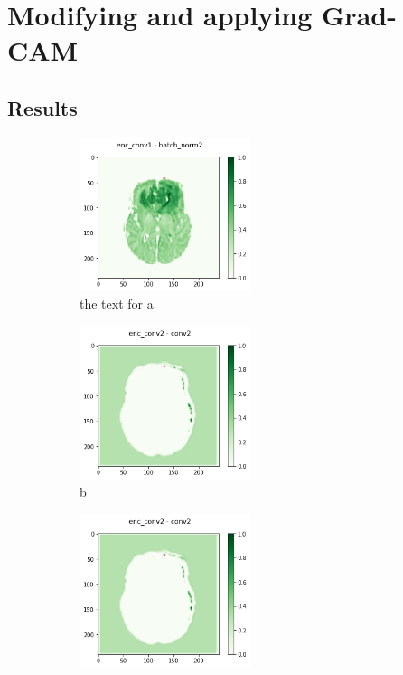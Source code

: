 \section{Modifying and applying Grad-CAM}

\subsection{Results}

\begin{figure}[H]
    \centering
    \caption{RISE Multipixel (Mean)}
    \begin{subfigure}{.25\textwidth}
        \centering
        \includegraphics[width=5cm]{chapters/04_segmentation/images/grad_cam_3.png}
        \caption{ the text for a}
    \end{subfigure}%
    \begin{subfigure}{.25\textwidth}
        \centering
        \includegraphics[width=5cm]{chapters/04_segmentation/images/grad_cam_5.png}
        \caption{b}
    \end{subfigure}
        \begin{subfigure}{.25\textwidth}
        \centering
        \includegraphics[width=5cm]{chapters/04_segmentation/images/grad_cam_5.png}

\end{subfigure}
\end{figure}
